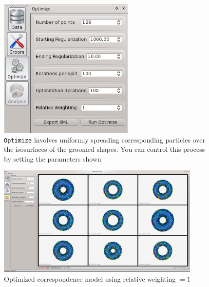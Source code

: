 \documentclass[letterpaper,12pt]{article}   %
\begin{document}
\vspace{0.05in}
\begin{figure}[!htp]
  \begin{minipage}[c]{0.7\textwidth}
  \centering
    \includegraphics[width=0.6\textwidth]{figs/optimize.png}
  \end{minipage}\hfill
  \begin{minipage}[c]{0.3\textwidth}
  \centering
    \caption{\texttt{Optimize} involves uniformly spreading corresponding particles over the isosurfaces of the groomed shapes. You can control this process by setting the parameters shown } 
    \label{fig:optimize}
  \end{minipage}
\end{figure}
\vspace{0.1in}
\begin{figure}[!htp]
\centering
\includegraphics[width=0.9\textwidth]{figs/relative_1.png}
\caption{Optimized correspondence model using relative weighting $ = 1$}
\label{fig:rel1}
\end{figure}
\end{document}
